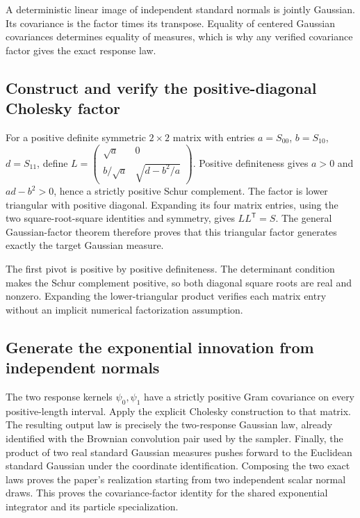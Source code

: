 \documentclass[11pt,a4paper]{report}
\begin{document}
A deterministic linear image of independent standard normals is jointly Gaussian. Its covariance is the factor times its transpose. Equality of centered Gaussian covariances determines equality of measures, which is why any verified covariance factor gives the exact response law.

\subsection{\texorpdfstring{Construct and verify the positive-diagonal Cholesky factor}{Construct and verify the positive-diagonal Cholesky factor}}
\label{report-step-KineticLangevin-GaussianFactor-lean-2}


For a positive definite symmetric \(2\times2\) matrix with entries \(a=S_{00}\), \(b=S_{10}\), \(d=S_{11}\), define \(L=\begin{pmatrix}\sqrt a&0\\b/\sqrt a&\sqrt{d-b^2/a}\end{pmatrix}\). Positive definiteness gives \(a>0\) and \(ad-b^2>0\), hence a strictly positive Schur complement. The factor is lower triangular with positive diagonal. Expanding its four matrix entries, using the two square-root-square identities and symmetry, gives \(LL^\mathsf T=S\). The general Gaussian-factor theorem therefore proves that this triangular factor generates exactly the target Gaussian measure.



The first pivot is positive by positive definiteness. The determinant condition makes the Schur complement positive, so both diagonal square roots are real and nonzero. Expanding the lower-triangular product verifies each matrix entry without an implicit numerical factorization assumption.

\subsection{\texorpdfstring{Generate the exponential innovation from independent normals}{Generate the exponential innovation from independent normals}}
\label{report-step-KineticLangevin-GaussianFactor-lean-3}


The two response kernels \(\psi_0,\psi_1\) have a strictly positive Gram covariance on every positive-length interval. Apply the explicit Cholesky construction to that matrix. The resulting output law is precisely the two-response Gaussian law, already identified with the Brownian convolution pair used by the sampler. Finally, the product of two real standard Gaussian measures pushes forward to the Euclidean standard Gaussian under the coordinate identification. Composing the two exact laws proves the paper’s realization starting from two independent scalar normal draws. This proves the covariance-factor identity for the shared exponential integrator and its particle specialization.
\end{document}
